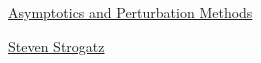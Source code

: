\documentclass[11pt]{article}
\begin{document}
	\kaishu 
	\setcounter{section}{0}
	\begin{center}
		{\LARGE  \href{https://www.youtube.com/playlist?list=PL5EH0ZJ7V0jV7kMYvPcZ7F9oaf_YAlfbI}{Asymptotics and Perturbation Methods}}
		
		
		{\large \href{https://www.stevenstrogatz.com/}{Steven Strogatz}}
	\end{center}
\setcounter{page}{1}



\vspace{-1cm}
\end{document}
